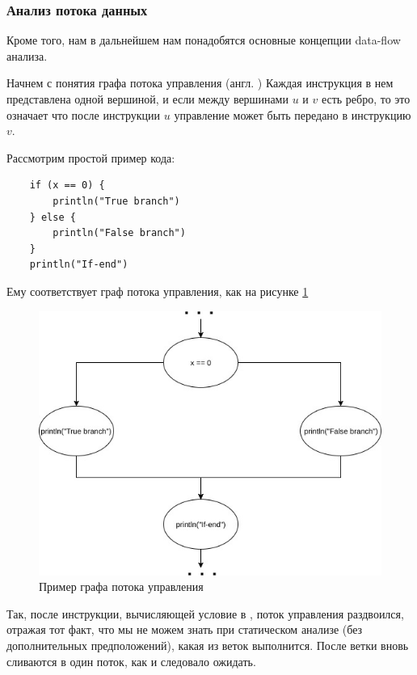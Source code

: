 \subsubsection{Анализ потока данных}

Кроме того, нам в дальнейшем нам понадобятся основные концепции data-flow анализа.

Начнем с понятия графа потока управления (англ. ) Каждая инструкция в нем представлена одной вершиной, и если между вершинами $u$ и $v$ есть ребро, то это означает что после инструкции $u$ управление может быть передано 
в инструкцию $v$. 

Рассмотрим простой пример кода:

\begin{verbatim}
    if (x == 0) {
        println("True branch")
    } else {
        println("False branch")
    }
    println("If-end")    
\end{verbatim}

Ему соответствует граф потока управления, как на рисунке \ref{control-flow-example}

\begin{figure}
    \centering
    \includegraphics[scale=0.5]{img/control-flow-example}
    \caption{Пример графа потока управления}
    \label{control-flow-example}
\end{figure}


Так, после инструкции, вычисляющей условие в , поток управления раздвоился, отражая тот факт, что мы не можем знать при статическом анализе (без дополнительных предположений), какая из веток выполнится. После ветки вновь сливаются в один поток, как и следовало ожидать.

